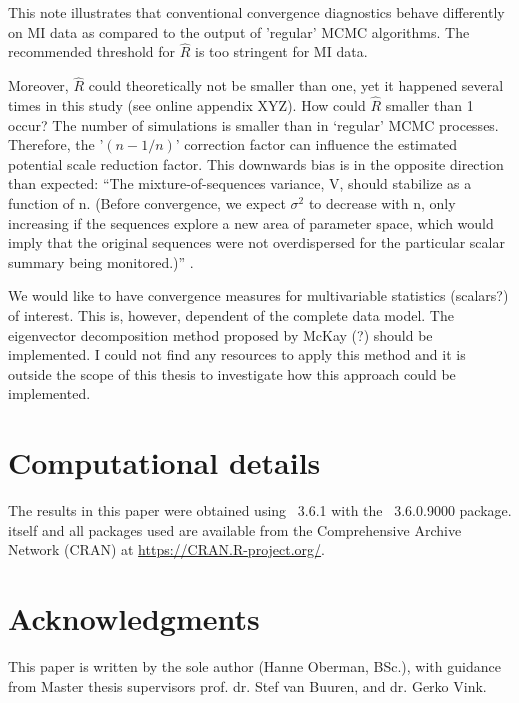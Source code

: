 \documentclass[article]{jss}
\begin{document}
This note illustrates that conventional convergence diagnostics behave differently on MI data as compared to the output of 'regular' MCMC algorithms. The recommended threshold for $\widehat{R}$ is too stringent for MI data.

Moreover, $\widehat{R}$ could theoretically not be smaller than one, yet it happened several times in this study (see online appendix XYZ). How could $\widehat{R}$ smaller than 1 occur? The number of simulations is smaller than in `regular' MCMC processes. Therefore, the '$(n-1/n)$' correction factor can influence the estimated potential scale reduction factor. This downwards bias is in the opposite direction than expected: ``The mixture-of-sequences variance, V, should stabilize as a function of n. (Before convergence, we expect $\sigma^2$ to decrease with n, only increasing if the sequences explore a new area of parameter space, which would imply that the original sequences were not overdispersed for the particular scalar summary being monitored.)'' \cite[p~438]{broo98}.

We would like to have convergence measures for multivariable statistics (scalars?) of interest. This is, however, dependent of the complete data model. The eigenvector decomposition method proposed by McKay (?) should be implemented. I could not find any resources to apply this method and it is outside the scope of this thesis to investigate how this approach could be implemented.



\section*{Computational details}

The results in this paper were obtained using ~3.6.1 with the ~3.6.0.9000 package.  itself and all packages used are available from the Comprehensive  Archive Network (CRAN) at \url{https://CRAN.R-project.org/}.


\section*{Acknowledgments}

This paper is written by the sole author (Hanne Oberman, BSc.), with guidance from Master thesis supervisors prof. dr. Stef van Buuren, and dr. Gerko Vink.

\end{document}

